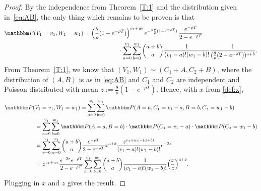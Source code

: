 \documentclass[preprint,authoryear]{elsarticle}
\theoremstyle{definition}
\numberwithin{equation}{section}
\numberwithin{figure}{section}
\begin{document}
\begin{proof}
  By the independence from Theorem~\ref{T:1} and the distribution
  given in~\eqref{eq:AB}, the only thing which remains to be proven is
  that
  \begin{align*}
    \mathbbm P( V_1=v_1, W_1=w_1) 
    & = \Big(\frac{\theta}{\rho}(1-e^{-\rho T})\Big)^{v_1+w_1} 
      e^{-2\frac{\theta}{\rho}(1-e^{-\rho T})} \, \frac{e^{-\rho T}}{2-e^{-\rho T}} 
    \\ & \qquad \qquad \qquad 
         \cdot\sum_{a=0}^{v_1} \sum_{b=0}^{w_1} \binom{a+b}{a} 
         \frac{1}{(v_1-a)!(w_1-b)!}\frac{1}{(\frac{\theta}{\rho}(2-e^{-\rho T}))^{a+b}}.
  \end{align*}
  From Theorem~\ref{T:1}, we know that
  $(V_1, W_1) \sim (C_{\mathfrak 1} + A, C_{\mathfrak 2} + B)$, where
  the distribution of $(A,B)$ is as in \eqref{eq:AB} and
  $C_{\mathfrak 1}$ and $C_{\mathfrak 2}$ are independent and Poisson
  distributed with mean $z:=\frac\theta\rho(1-e^{-\rho T})$.
  Hence, with $x$ from \eqref{def:x},
  \begin{align*}
    \mathbbm P(& V_1=v_1,W_1=w_1) 
                 = \sum_{a=0}^{v_1} \sum_{b=0}^{w_1} \mathbbm P(A = a, 
                 C_{\mathfrak 1}=v_1-a, B=b, C_{\mathfrak 2} = w_1-b)
    \\ &= \sum_{a=0}^{v_1} \sum_{b=0}^{w_1} \mathbbm P(A = a, B=b) \cdot 
         \mathbbm P(C_{\mathfrak 1}=v_1-a) \cdot \mathbbm P(C_{\mathfrak 2}=w_1-b)
    \\ &=\sum_{v=0}^{v_1} \sum_{w=0}^{w_1} \binom{a+b}{a} \frac{e^{-\rho T}}{2-e^{-\rho T}}
         x^{a+b}
         \frac{z^{v_1+w_1-(a+b)}}{(v_1-a)!(w_1-b)!} e^{-2z}\\
               &= z^{v_1  +w_1} \frac{e^{-2z}e^{-\rho T}}{2 - e^{-\rho T}} 
                 \sum_{a=0}^{v_1} \sum_{b=0}^{w_1} \binom{a+b}{a} \frac{1}{(v_1-a)!(w_1-b)!} 
                 \Big(\frac{x}{z}\Big)^{a+b}.
  \end{align*}
  Plugging in $x$ and $z$ gives the result.
\end{proof}
\end{document}
